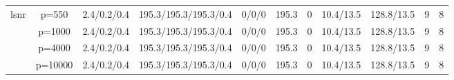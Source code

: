 \begin{table}[ht]
{\begin{tabular}{|c|c|ccccccccc|}
  \midrule\multirow{4}[2]{*}{lsnr} & p=550 & 2.4/0.2/0.4 & 195.3/195.3/195.3/0.4 & 0/0/0 & 195.3 & 0 & 10.4/13.5 & 128.8/13.5 & 9 & 8 \\ 
   & p=1000 & 2.4/0.2/0.4 & 195.3/195.3/195.3/0.4 & 0/0/0 & 195.3 & 0 & 10.4/13.5 & 128.8/13.5 & 9 & 8 \\ 
   & p=4000 & 2.4/0.2/0.4 & 195.3/195.3/195.3/0.4 & 0/0/0 & 195.3 & 0 & 10.4/13.5 & 128.8/13.5 & 9 & 8 \\ 
   & p=10000 & 2.4/0.2/0.4 & 195.3/195.3/195.3/0.4 & 0/0/0 & 195.3 & 0 & 10.4/13.5 & 128.8/13.5 & 9 & 8 \\ 
   \bottomrule 
\end{tabular}
}
\end{table}

